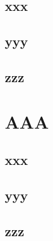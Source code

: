 \documentclass[10pt, a4paper, theme = draft]{main}
\begin{document}
\subsection{xxx}
\subsection{yyy}
\subsection{zzz}

\section{AAA}
\subsection{xxx}
\subsection{yyy}
\subsection{zzz}
\end{document}
